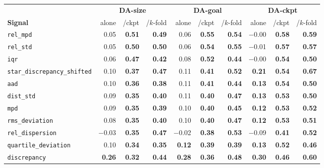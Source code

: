 \begin{table}[h]
\centering
\scriptsize
\begin{tabular}{@{}lrrrrrrrrr@{}}
\toprule
 & \multicolumn{3}{c}{\textbf{DA-size}} & \multicolumn{3}{c}{\textbf{DA-goal}} & \multicolumn{3}{c}{\textbf{DA-ckpt}} \\
\cmidrule(lr){2-4}\cmidrule(lr){5-7}\cmidrule(lr){8-10}
\textbf{Signal} & alone & /ckpt & /$k$-fold & alone & /ckpt & /$k$-fold & alone & /ckpt & /$k$-fold \\
\midrule
\texttt{rel\_mpd} & 0.05 & \textbf{0.51} & \textbf{0.49} & 0.06 & \textbf{0.55} & \textbf{0.54} & $-$0.00 & \textbf{0.58} & \textbf{0.59} \\
\texttt{rel\_std} & 0.05 & \textbf{0.50} & \textbf{0.50} & 0.06 & \textbf{0.54} & \textbf{0.55} & $-$0.01 & \textbf{0.57} & \textbf{0.57} \\
\texttt{iqr} & 0.06 & \textbf{0.47} & \textbf{0.42} & 0.08 & \textbf{0.52} & \textbf{0.44} & $-$0.00 & \textbf{0.54} & \textbf{0.50} \\
\texttt{star\_discrepancy\_shifted} & 0.10 & \textbf{0.37} & \textbf{0.47} & 0.11 & \textbf{0.41} & \textbf{0.52} & \textbf{0.21} & \textbf{0.54} & \textbf{0.67} \\
\texttt{aad} & 0.10 & \textbf{0.36} & \textbf{0.38} & 0.11 & \textbf{0.41} & \textbf{0.44} & \textbf{0.13} & \textbf{0.54} & \textbf{0.50} \\
\texttt{dist\_std} & 0.09 & \textbf{0.35} & \textbf{0.40} & 0.11 & \textbf{0.40} & \textbf{0.47} & \textbf{0.13} & \textbf{0.53} & \textbf{0.50} \\
\texttt{mpd} & 0.09 & \textbf{0.35} & \textbf{0.39} & 0.10 & \textbf{0.40} & \textbf{0.45} & \textbf{0.12} & \textbf{0.53} & \textbf{0.52} \\
\texttt{rms\_deviation} & 0.08 & \textbf{0.35} & \textbf{0.40} & 0.10 & \textbf{0.40} & \textbf{0.47} & \textbf{0.12} & \textbf{0.53} & \textbf{0.51} \\
\texttt{rel\_dispersion} & $-$0.03 & \textbf{0.35} & \textbf{0.47} & $-$0.02 & \textbf{0.38} & \textbf{0.53} & $-$0.09 & \textbf{0.41} & \textbf{0.52} \\
\texttt{quartile\_deviation} & 0.10 & \textbf{0.34} & \textbf{0.35} & \textbf{0.12} & \textbf{0.39} & \textbf{0.39} & \textbf{0.13} & \textbf{0.52} & \textbf{0.46} \\
\texttt{discrepancy} & \textbf{0.26} & \textbf{0.32} & \textbf{0.44} & \textbf{0.28} & \textbf{0.36} & \textbf{0.48} & \textbf{0.30} & \textbf{0.46} & \textbf{0.60} \\

\end{tabular}
\end{table}
